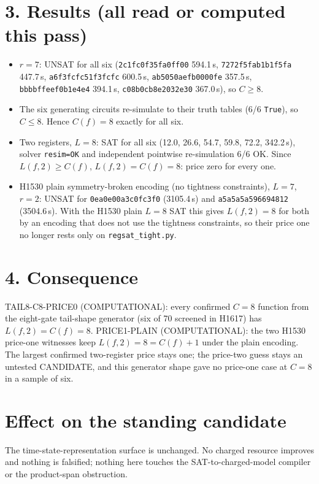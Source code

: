 \documentclass[11pt]{article}
\begin{document}
\section*{3. Results (all read or computed this pass)}
\begin{itemize}
\item $r=7$: UNSAT for all six (\texttt{2c1fc0f35fa0ff00} 594.1\,s, \texttt{7272f5fab1b1f5fa} 447.7\,s, \texttt{a6f3fcfc51f3fcfc} 600.5\,s, \texttt{ab5050aefb0000fe} 357.5\,s, \texttt{bbbbffeef0b1e4e4} 394.1\,s, \texttt{c08b0cb8e2032e30} 367.0\,s), so $C\ge8$.
\item The six generating circuits re-simulate to their truth tables (6/6 \texttt{True}), so $C\le8$. Hence $C(f)=8$ exactly for all six.
\item Two registers, $L=8$: SAT for all six (12.0, 26.6, 54.7, 59.8, 72.2, 342.2\,s), solver \texttt{resim=OK} and independent pointwise re-simulation 6/6 OK. Since $L(f,2)\ge C(f)$, $L(f,2)=C(f)=8$: price zero for every one.
\item H1530 plain symmetry-broken encoding (no tightness constraints), $L=7$, $r=2$: UNSAT for \texttt{0ea0e00a3c0fc3f0} (3105.4\,s) and \texttt{a5a5a5a596694812} (3504.6\,s). With the H1530 plain $L=8$ SAT this gives $L(f,2)=8$ for both by an encoding that does not use the tightness constraints, so their price one no longer rests only on \texttt{regsat\_tight.py}.
\end{itemize}

\section*{4. Consequence}
TAIL8-C8-PRICE0 (COMPUTATIONAL): every confirmed $C=8$ function from the eight-gate tail-shape generator (six of 70 screened in H1617) has $L(f,2)=C(f)=8$. PRICE1-PLAIN (COMPUTATIONAL): the two H1530 price-one witnesses keep $L(f,2)=8=C(f)+1$ under the plain encoding. The largest confirmed two-register price stays one; the price-two guess stays an untested CANDIDATE, and this generator shape gave no price-one case at $C=8$ in a sample of six.

\section*{Effect on the standing candidate}
The time-state-representation surface is unchanged. No charged resource improves and nothing is falsified; nothing here touches the SAT-to-charged-model compiler or the product-span obstruction.
\end{document}
